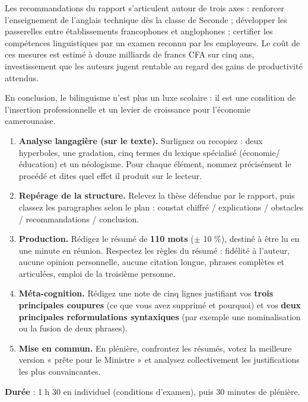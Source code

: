 \documentclass[11pt]{article}
\newcommand{\cle}[1]{{\popxbold\color{popdark}#1}}
\newcounter{popsec}
\newcounter{popsub}
\newcommand{\courssub}[1]{%
  \stepcounter{popsub}%
  \par\vspace{9pt}\noindent{\popxbold\fontsize{11.5}{13}\selectfont\color{popink}{\color{poporange}\thepopsec.\thepopsub}\hspace{6pt}#1}\par\nopagebreak\vspace{4pt}
}
\begin{document}
\begin{exemplebox}
Les recommandations du rapport s'articulent autour de trois axes : renforcer l'enseignement de l'anglais technique dès la classe de Seconde ; développer les passerelles entre établissements francophones et anglophones ; certifier les compétences linguistiques par un examen reconnu par les employeurs. Le coût de ces mesures est estimé à douze milliards de francs CFA sur cinq ans, investissement que les auteurs jugent rentable au regard des gains de productivité attendus.

En conclusion, le bilinguisme n'est plus un luxe scolaire : il est une condition de l'insertion professionnelle et un levier de croissance pour l'économie camerounaise.
\end{exemplebox}

\courssub{Consignes}

\begin{enumerate}
\item \textbf{Analyse langagière (sur le texte).} Surlignez ou recopiez : deux \cle{hyperboles}, une \cle{gradation}, cinq termes du \cle{lexique spécialisé} (économie/éducation) et un \cle{néologisme}. Pour chaque élément, nommez précisément le procédé et dites quel effet il produit sur le lecteur.
\item \textbf{Repérage de la structure.} Relevez la thèse défendue par le rapport, puis classez les paragraphes selon le plan : constat chiffré / explications / obstacles / recommandations / conclusion.
\item \textbf{Production.} Rédigez le résumé de \textbf{110 mots} ($\pm$ 10 \%), destiné à être lu en une minute en réunion. Respectez les règles du résumé : fidélité à l'auteur, aucune opinion personnelle, aucune citation longue, phrases complètes et articulées, emploi de la troisième personne.
\item \textbf{Méta-cognition.} Rédigez une note de cinq lignes justifiant vos \textbf{trois principales coupures} (ce que vous avez supprimé et pourquoi) et vos \textbf{deux principales reformulations syntaxiques} (par exemple une nominalisation ou la fusion de deux phrases).
\item \textbf{Mise en commun.} En plénière, confrontez les résumés, votez la meilleure version « prête pour le Ministre » et analysez collectivement les justifications les plus convaincantes.
\end{enumerate}

\textbf{Durée} : 1 h 30 en individuel (conditions d'examen), puis 30 minutes de plénière.
\end{document}
